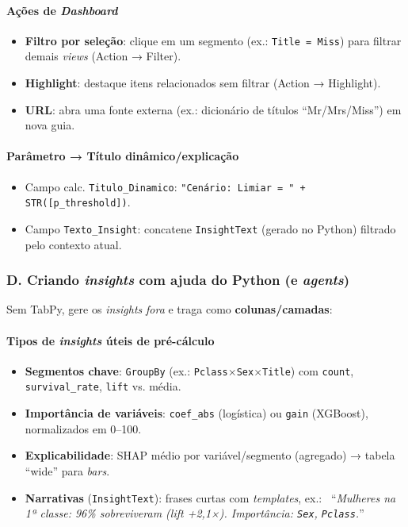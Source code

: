 \paragraph{Ações de \textit{Dashboard}}
\begin{itemize}[leftmargin=*]
\item \textbf{Filtro por seleção}: clique em um segmento (ex.: \texttt{Title = Miss}) para filtrar demais \emph{views} (Action → Filter).
\item \textbf{Highlight}: destaque itens relacionados sem filtrar (Action → Highlight).
\item \textbf{URL}: abra uma fonte externa (ex.: dicionário de títulos “Mr/Mrs/Miss”) em nova guia.
\end{itemize}

\paragraph{Parâmetro → Título dinâmico/explicação}
\begin{itemize}[leftmargin=*]
\item Campo calc. \texttt{Titulo_Dinamico}: \texttt{"Cenário: Limiar = " + STR([p_threshold])}.
\item Campo \texttt{Texto_Insight}: concatene \texttt{InsightText} (gerado no Python) filtrado pelo contexto atual.
\end{itemize}

\subsubsection*{D. Criando \emph{insights} com ajuda do Python (e \emph{agents})}
Sem TabPy, gere os \emph{insights} \emph{fora} e traga como \textbf{colunas/camadas}:

\paragraph{Tipos de \emph{insights} úteis de pré-cálculo}
\begin{itemize}[leftmargin=*]
\item \textbf{Segmentos chave}: \texttt{GroupBy} (ex.: \texttt{Pclass}×\texttt{Sex}×\texttt{Title}) com \texttt{count}, \texttt{survival_rate}, \texttt{lift} vs. média.
\item \textbf{Importância de variáveis}: \texttt{coef_abs} (logística) ou \texttt{gain} (XGBoost), normalizados em 0–100.
\item \textbf{Explicabilidade}: SHAP médio por variável/segmento (agregado) → tabela “wide” para \emph{bars}.
\item \textbf{Narrativas} (\texttt{InsightText}): frases curtas com \emph{templates}, ex.: \
“\emph{Mulheres na 1ª classe: 96\% sobreviveram (lift +2{,}1×). Importância: \texttt{Sex}, \texttt{Pclass}.}”
\end{itemize}

